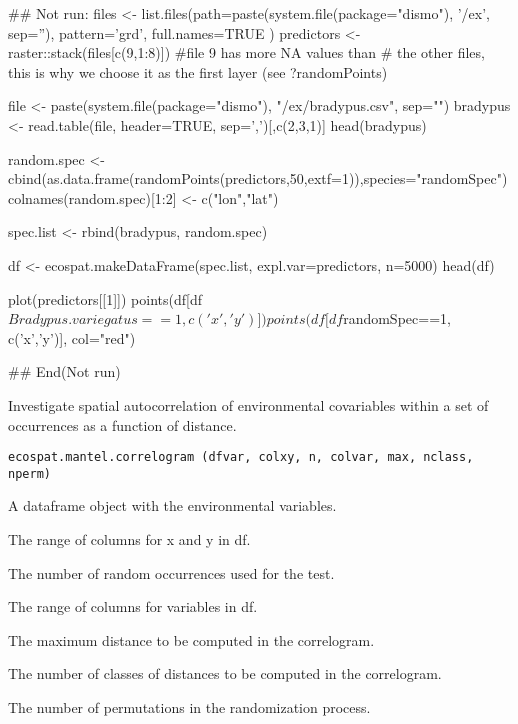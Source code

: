 \documentclass[a4paper]{book}
\begin{document}
%
\begin{Examples}
\begin{ExampleCode}
## Not run: 
files <- list.files(path=paste(system.file(package="dismo"),
                               '/ex', sep=''), pattern='grd', full.names=TRUE )
predictors <- raster::stack(files[c(9,1:8)])   #file 9 has more NA values than
# the other files, this is why we choose it as the first layer (see ?randomPoints)

file <- paste(system.file(package="dismo"), "/ex/bradypus.csv", sep="")
bradypus <- read.table(file, header=TRUE, sep=',')[,c(2,3,1)]
head(bradypus)

random.spec <- cbind(as.data.frame(randomPoints(predictors,50,extf=1)),species="randomSpec")
colnames(random.spec)[1:2] <- c("lon","lat")

spec.list <- rbind(bradypus, random.spec)

df <- ecospat.makeDataFrame(spec.list, expl.var=predictors, n=5000)
head(df)

plot(predictors[[1]])
points(df[df$Bradypus.variegatus==1, c('x','y')])
points(df[df$randomSpec==1, c('x','y')], col="red")


## End(Not run)
\end{ExampleCode}
\end{Examples}
%
\begin{Description}\relax
Investigate spatial autocorrelation of environmental covariables within a set of occurrences as a function of distance.
\end{Description}
%
\begin{Usage}
\begin{verbatim}
ecospat.mantel.correlogram (dfvar, colxy, n, colvar, max, nclass, nperm)
\end{verbatim}
\end{Usage}
%
\begin{Arguments}
\begin{ldescription}
\item[\code{dfvar}] A dataframe object with the environmental variables.
\item[\code{colxy}] The range of columns for x and y in df.
\item[\code{n}] The number of random occurrences used for the test.
\item[\code{colvar}] The range of columns for variables in df.
\item[\code{max}] The maximum distance to be computed in the correlogram.
\item[\code{nclass}] The number of classes of distances to be computed in the correlogram.
\item[\code{nperm}] The number of permutations in the randomization process.
\end{ldescription}
\end{Arguments}
\end{document}
